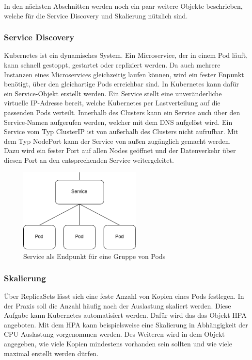 In den nächsten Abschnitten werden noch ein paar weitere Objekte beschrieben, welche für die Service Discovery und Skalierung nützlich sind.

\subsubsection{Service Discovery}
Kubernetes ist ein dynamisches System. Ein Microservice, der in einem Pod läuft, kann schnell gestoppt, gestartet oder repliziert werden. Da auch mehrere Instanzen eines Microservices gleichzeitig laufen können, wird ein fester Enpunkt benötigt, über den gleichartige Pods erreichbar sind. In Kubernetes kann dafür ein Service-Objekt erstellt werden. Ein Service stellt eine unveränderliche virtuelle IP-Adresse bereit, welche Kubernetes per Lastverteilung auf die passenden Pods verteilt. Innerhalb des Clusters kann ein Service auch über den Service-Namen aufgerufen werden, welcher mit dem \ac{DNS} aufgelöst wird. Ein Service vom Typ ClusterIP ist von außerhalb des Clusters nicht aufrufbar. Mit dem Typ NodePort kann der Service von außen zugänglich gemacht werden. Dazu wird ein fester Port auf allen Nodes geöffnet und der Datenverkehr über diesen Port an den entsprechenden Service weitergeleitet.

\begin{figure}[H] 
    \centering
    \includegraphics[width=0.55\textwidth]{figures/KubernetesService.png}
    \caption{Service als Endpunkt für eine Gruppe von Pods \parencite[vgl.][S. 67]{arundelCloud2019}}
\end{figure}

\subsubsection{Skalierung}

Über ReplicaSets lässt sich eine feste Anzahl von Kopien eines Pods festlegen. In der Praxis soll die Anzahl häufig nach der Auslastung skaliert werden. Diese Aufgabe kann Kubernetes automatisiert werden. Dafür wird das das Objekt \ac{HPA} angeboten. Mit dem \ac{HPA} kann beispielsweise eine Skalierung in Abhängigkeit der CPU-Auslastung vorgenommen werden. Des Weiteren wird in dem Objekt angegeben, wie viele Kopien mindestens vorhanden sein sollten und wie viele maximal erstellt werden dürfen. 

